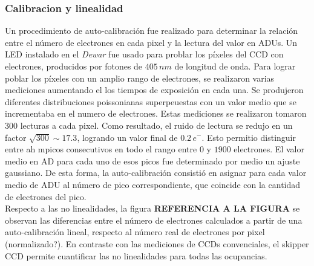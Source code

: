 \subsubsection{Calibracion y linealidad}
Un procedimiento de auto-calibración fue realizado para determinar la relación entre el número de electrones en cada pixel y la lectura del valor en ADUs. Un LED instalado en el \textit{Dewar} fue usado para problar los píxeles del CCD con electrones, producidos por fotones de $405\,\si{nm}$ de longitud de onda. Para lograr poblar los píxeles con un amplio rango de electrones, se realizaron varias mediciones aumentando el los tiempos de exposición en cada una. Se produjeron diferentes distribuciones poissonianas superpeuestas con un valor medio que se incrementaba en el numero de electrones. Estas mediciones se realizaron tomaron 300 lecturas a cada pixel. Como resultado, el ruido de lectura se redujo en un factor $\sqrt{300} \sim 17.3$, logrando un valor final de $0.2\,e^{-}$. Esto permitio distinguir entre ah mpicos consecutivos en todo el rango entre $0$ y $1900$ electrones. El valor medio en AD para cada uno de esos picos fue determinado por medio un ajuste gaussiano. De esta forma, la auto-calibración consistió en asignar para cada valor medio de ADU al número de pico correspondiente, que coincide con la cantidad de electrones del pico.\\
\indent Respecto a las no linealidades, la figura \textbf{REFERENCIA A LA FIGURA} se observan las diferencias entre el número de electrones calculados a partir de una auto-calibración lineal, respecto al número real de electrones por pixel (normalizado?). En contraste con las mediciones de CCDs convenciales, el skipper CCD permite cuantificar las no linealidades para todas las ocupancias.


